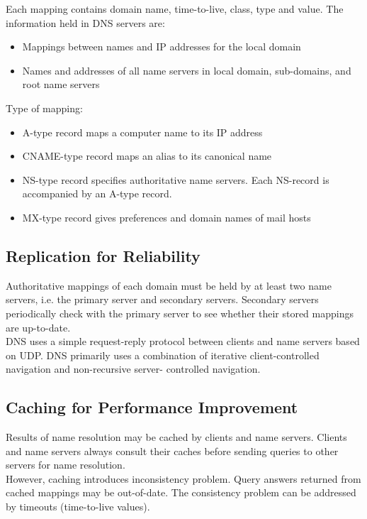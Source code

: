 \begin{multicols*}{2}
\noindent Each mapping contains domain name, time-to-live, class, type and value. The information held in DNS servers are:
\begin{itemize}
  \item Mappings between names and IP addresses for the local domain
  \item Names and addresses of all name servers in local domain, sub-domains, and root name servers
\end{itemize}

\noindent Type of mapping:
\begin{itemize}
  \item A-type record maps a computer name to its IP address
  \item CNAME-type record maps an alias to its canonical name
  \item NS-type record specifies authoritative name servers. Each NS-record is accompanied by an A-type record.
  \item MX-type record gives preferences and domain names of mail hosts
\end{itemize}

\subsection{Replication for Reliability}

\noindent Authoritative mappings of each domain must be held by at least two name servers, i.e. the primary server and secondary servers. Secondary servers periodically check with the primary server to see whether their stored mappings are up-to-date. \\

\noindent DNS uses a simple request-reply protocol between clients and name servers based on UDP. DNS primarily uses a combination of iterative client-controlled navigation and non-recursive server- controlled navigation. 

\subsection{Caching for Performance Improvement}

\noindent Results of name resolution may be cached by clients and name servers. Clients and name servers always consult their caches before sending queries to other servers for name resolution. \\

\noindent However, caching introduces inconsistency problem. Query answers returned from cached mappings may be out-of-date. The consistency problem can be addressed by timeouts (time-to-live values).

\end{multicols*}
